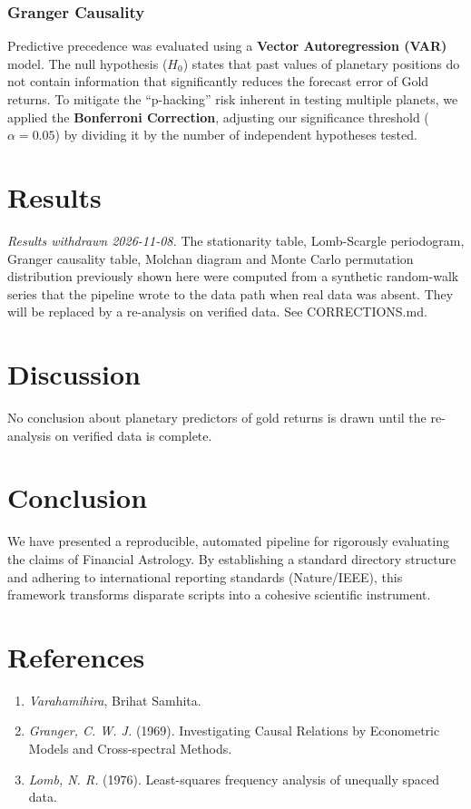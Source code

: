 \documentclass[
  american,
  11pt,
  a4paper,
  oneside,
  openany]{article}
\providecommand{\tightlist}{%
  \setlength{\itemsep}{0pt}\setlength{\parskip}{0pt}}
\begin{document}
\subsubsection{Granger Causality}\label{granger-causality}

Predictive precedence was evaluated using a \textbf{Vector
Autoregression (VAR)} model. The null hypothesis (\(H_0\)) states that
past values of planetary positions do not contain information that
significantly reduces the forecast error of Gold returns. To mitigate
the ``p-hacking'' risk inherent in testing multiple planets, we applied
the \textbf{Bonferroni Correction}, adjusting our significance threshold
(\(\alpha = 0.05\)) by dividing it by the number of independent
hypotheses tested.

\section{Results}\label{results}

\emph{Results withdrawn 2026-11-08.} The stationarity table,
Lomb-Scargle periodogram, Granger causality table, Molchan diagram and
Monte Carlo permutation distribution previously shown here were computed
from a synthetic random-walk series that the pipeline wrote to the data
path when real data was absent. They will be replaced by a re-analysis
on verified data. See CORRECTIONS.md.

\section{Discussion}\label{discussion}

No conclusion about planetary predictors of gold returns is drawn until
the re-analysis on verified data is complete.

\section{Conclusion}\label{conclusion}

We have presented a reproducible, automated pipeline for rigorously
evaluating the claims of Financial Astrology. By establishing a standard
directory structure and adhering to international reporting standards
(Nature/IEEE), this framework transforms disparate scripts into a
cohesive scientific instrument.

\section{References}\label{references}

\begin{enumerate}
\def\labelenumi{\arabic{enumi}.}
\tightlist
\item
  \emph{Varahamihira}, Brihat Samhita.
\item
  \emph{Granger, C. W. J.} (1969). Investigating Causal Relations by
  Econometric Models and Cross-spectral Methods.
\item
  \emph{Lomb, N. R.} (1976). Least-squares frequency analysis of
  unequally spaced data.
\end{enumerate}
\end{document}
